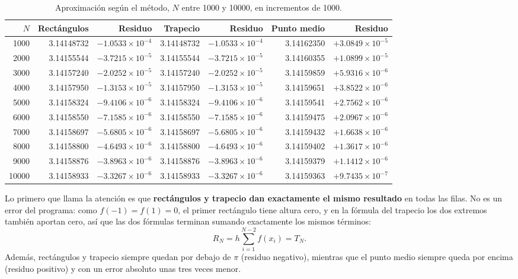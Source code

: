 \begin{table}[H]
\centering
\caption{Aproximación según el método, \(N\) entre 1000 y 10000, en incrementos de 1000.}
\label{tab:e3_1000a10000}
\footnotesize
\setlength{\tabcolsep}{3pt}
\begin{tabular}{r r r r r r r}
\toprule
\(N\) & Rectángulos & Residuo & Trapecio & Residuo & Punto medio & Residuo \\
\midrule
1000  & 3.14148732 & \(-1.0533\times10^{-4}\) & 3.14148732 & \(-1.0533\times10^{-4}\) & 3.14162350 & \(+3.0849\times10^{-5}\) \\
2000  & 3.14155544 & \(-3.7215\times10^{-5}\) & 3.14155544 & \(-3.7215\times10^{-5}\) & 3.14160355 & \(+1.0899\times10^{-5}\) \\
3000  & 3.14157240 & \(-2.0252\times10^{-5}\) & 3.14157240 & \(-2.0252\times10^{-5}\) & 3.14159859 & \(+5.9316\times10^{-6}\) \\
4000  & 3.14157950 & \(-1.3153\times10^{-5}\) & 3.14157950 & \(-1.3153\times10^{-5}\) & 3.14159651 & \(+3.8522\times10^{-6}\) \\
5000  & 3.14158324 & \(-9.4106\times10^{-6}\) & 3.14158324 & \(-9.4106\times10^{-6}\) & 3.14159541 & \(+2.7562\times10^{-6}\) \\
6000  & 3.14158550 & \(-7.1585\times10^{-6}\) & 3.14158550 & \(-7.1585\times10^{-6}\) & 3.14159475 & \(+2.0967\times10^{-6}\) \\
7000  & 3.14158697 & \(-5.6805\times10^{-6}\) & 3.14158697 & \(-5.6805\times10^{-6}\) & 3.14159432 & \(+1.6638\times10^{-6}\) \\
8000  & 3.14158800 & \(-4.6493\times10^{-6}\) & 3.14158800 & \(-4.6493\times10^{-6}\) & 3.14159402 & \(+1.3617\times10^{-6}\) \\
9000  & 3.14158876 & \(-3.8963\times10^{-6}\) & 3.14158876 & \(-3.8963\times10^{-6}\) & 3.14159379 & \(+1.1412\times10^{-6}\) \\
10000 & 3.14158933 & \(-3.3267\times10^{-6}\) & 3.14158933 & \(-3.3267\times10^{-6}\) & 3.14159363 & \(+9.7435\times10^{-7}\) \\
\bottomrule
\end{tabular}
\end{table}

Lo primero que llama la atención es que \textbf{rectángulos y trapecio dan exactamente el mismo resultado} en todas las filas. No es un error del programa: como \(f(-1)=f(1)=0\), el primer rectángulo tiene altura cero, y en la fórmula del trapecio los dos extremos también aportan cero, así que las dos fórmulas terminan sumando exactamente los mismos términos:
\[
R_N=h\sum_{i=1}^{N-2}f(x_i)=T_N.
\]
Además, rectángulos y trapecio siempre quedan por debajo de \(\pi\) (residuo negativo), mientras que el punto medio siempre queda por encima (residuo positivo) y con un error absoluto unas tres veces menor.


